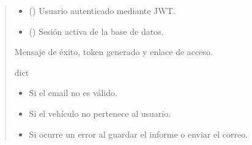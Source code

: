 \documentclass[letterpaper,10pt,spanish]{sphinxmanual}
\begin{document}
\begin{fulllineitems}
\begin{quote}
\begin{description}
\begin{itemize}
\item {} 
\sphinxAtStartPar
{} ({\hyperref[\detokenize{modelos:main.Usuario}]{}}) \textendash{} Usuario autenticado mediante JWT.

\item {} 
\sphinxAtStartPar
{} () \textendash{} Sesión activa de la base de datos.

\end{itemize}

\sphinxAtStartPar
Mensaje de éxito, token generado y enlace de acceso.

\sphinxAtStartPar
dict

\begin{itemize}
\item {} 
\sphinxAtStartPar
{} \textendash{} Si el email no es válido.

\item {} 
\sphinxAtStartPar
{} \textendash{} Si el vehículo no pertenece al usuario.

\item {} 
\sphinxAtStartPar
{} \textendash{} Si ocurre un error al guardar el informe o enviar el correo.

\end{itemize}

\end{description}\end{quote}

\end{fulllineitems}

\end{document}
